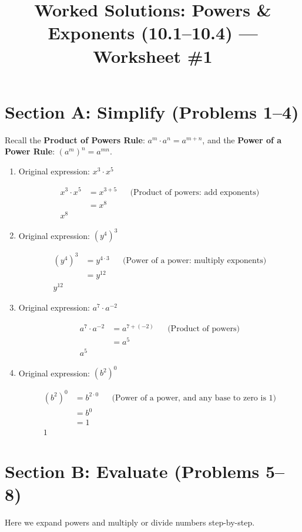 \documentclass{article}
\title{Worked Solutions: Powers \& Exponents (10.1--10.4) --- Worksheet \#1}
\author{}
\date{}
\begin{document}
\maketitle

\section*{Section A: Simplify (Problems 1--4)}
Recall the \textbf{Product of Powers Rule}: $a^m \cdot a^n = a^{m+n}$, and the \textbf{Power of a Power Rule}: $(a^m)^n = a^{mn}$.

\begin{enumerate}
\item
Original expression: \quad $x^3 \cdot x^5$

\begin{align*}
x^3 \cdot x^5 &= x^{3+5} && \text{(Product of powers: add exponents)} \\
&= x^8 \\
\boxed{x^8}
\end{align*}

\item
Original expression: \quad $(y^4)^3$

\begin{align*}
(y^4)^3 &= y^{4 \cdot 3} && \text{(Power of a power: multiply exponents)} \\
&= y^{12} \\
\boxed{y^{12}}
\end{align*}

\item
Original expression: \quad $a^7 \cdot a^{-2}$

\begin{align*}
a^7 \cdot a^{-2} &= a^{7 + (-2)} && \text{(Product of powers)} \\
&= a^5 \\
\boxed{a^5}
\end{align*}

\item
Original expression: \quad $(b^2)^0$

\begin{align*}
(b^2)^0 &= b^{2 \cdot 0} && \text{(Power of a power, and any base to zero is 1)} \\
&= b^0 \\
&= 1 \\
\boxed{1}
\end{align*}
\end{enumerate}

\section*{Section B: Evaluate (Problems 5--8)} 
Here we expand powers and multiply or divide numbers step-by-step.
\end{document}
